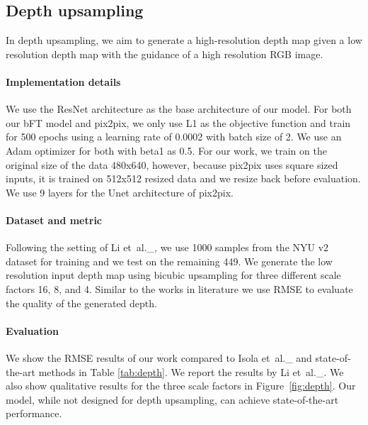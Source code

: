 \documentclass[10pt,twocolumn,letterpaper]{article}
\def\etal{et~al.\_}			  \def\eg{e.g.,~}               \def\ie{i.e.,~}               \def\etc{etc}                 \def\cf{cf.~}                 \def\viz{viz.~}               \def\vs{vs.~}
\newlength\paramargin
\newcommand{\figref}[1]{Figure~\ref{fig:#1}}
\begin{document}
\subsection{Depth upsampling}
In depth upsampling, we aim to generate a high-resolution depth map given a low resolution depth map with the guidance of a high resolution RGB image. 

\vspace{\paramargin} \paragraph{Implementation details} We use the ResNet architecture as the base architecture of our model. For both our bFT model and pix2pix, we only use L1 as the objective function and train for 500 epochs using a learning rate of 0.0002 with batch size of 2. We use an Adam optimizer for both with beta1 as 0.5. For our work, we train on the original size of the data 480x640, however, because pix2pix uses square sized inputs, it is trained on 512x512 resized data and we resize back before evaluation. We use 9 layers for the Unet architecture of pix2pix.



\vspace{\paramargin} \paragraph{Dataset and metric} Following the setting of Li \etal\cite{li2017joint}, we use 1000 samples from the NYU v2 dataset \cite{NYUdataset} for training and we test on the remaining 449. We generate the low resolution input depth map using bicubic upsampling for three different scale factors 16, 8, and 4.
Similar to the works in literature we use RMSE to evaluate the quality of the generated depth. 


\vspace{\paramargin} \paragraph{Evaluation}
We show the RMSE results of our work compared to Isola \etal\cite{isola2017image} and state-of-the-art methods in Table \ref{tab:depth}. We report the results by Li \etal\cite{li2017joint}. We also show qualitative results for the three scale factors in \figref{depth}. Our model, while not designed for depth upsampling, can achieve state-of-the-art performance.
\end{document}
